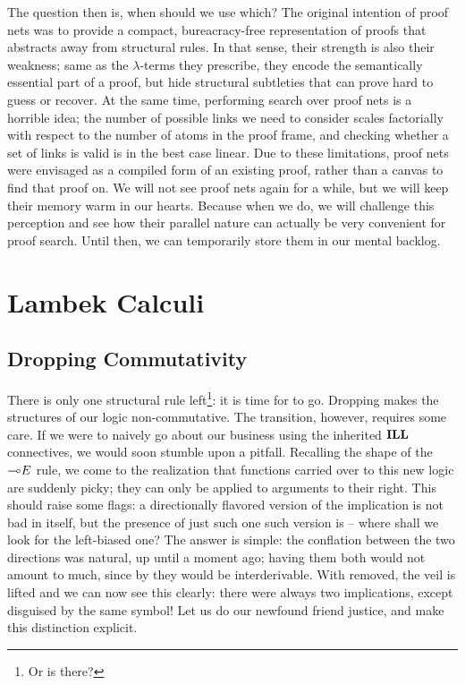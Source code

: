 The question then is, when should we use which?
The original intention of proof nets was to provide a compact, bureacracy-free representation of proofs that abstracts away from structural rules.
In that sense, their strength is also their weakness; same as the $\lambda$-terms they prescribe, they encode the semantically essential part of a proof, but hide structural subtleties that can prove hard to guess or recover.
At the same time, performing search over proof nets is a horrible idea; the number of possible links we need to consider scales factorially with respect to the number of atoms in the proof frame, and checking whether a set of links is valid is in the best case linear.
Due to these limitations, proof nets were envisaged as a compiled form of an existing proof, rather than a canvas to find that proof on.
We will not see proof nets again for a while, but we will keep their memory warm in our hearts.
Because when we do, we will challenge this perception and see how their parallel nature can actually be very convenient for proof search.
Until then, we can temporarily store them in our mental backlog. 


\section{Lambek Calculi}
\subsection{Dropping Commutativity}
There is only one structural rule left\footnote{Or is there?}: it is time for \Exchange{} to go.
Dropping \Exchange{} makes the structures of our logic non-commutative.
The transition, however, requires some care.
If we were to naively go about our business using the inherited $\textbf{ILL}$ connectives, we would soon stumble upon a pitfall.
Recalling the shape of the $\li E$ rule, we come to the realization that functions carried over to this new logic are suddenly picky; they can only be applied to arguments to their right.
This should raise some flags: a directionally flavored version of the implication is not bad in itself, but the presence of just such one such version is --  where shall we look for the left-biased one?
The answer is simple: the conflation between the two directions was natural, up until a moment ago; having them both would not amount to much, since by \Exchange{} they would be interderivable.
With \Exchange{} removed, the veil is lifted and we can now see this clearly: there were always two implications, except disguised by the same symbol!
Let us do our newfound friend justice, and make this distinction explicit.

